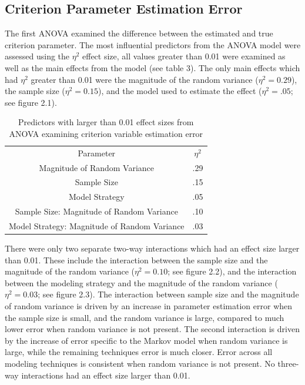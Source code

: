 \documentclass[12pt]{./styles/outhesis}
\begin{document}
\subsection{Criterion Parameter Estimation Error}
The first ANOVA examined the difference between the estimated and true
criterion parameter. The most influential predictors from the ANOVA
model were assessed using the \(\eta^2\) effect size, all values greater
than 0.01 were examined as well as the main effects from the model (see
table 3). The only main effects which had \(\eta^2\) greater than 0.01
were the magnitude of the random variance (\(\eta^2=0.29\)), the sample
size (\(\eta^2=0.15\)), and the model used to estimate the effect
(\(\eta^2=.05\); see figure 2.1).


\begin{table}
    \centering
    \begin{tabular}{cc}
        Parameter & \(\eta^2\) \\
        Magnitude of Random Variance & .29 \\
        Sample Size & .15\\
        Model Strategy & .05 \\
        Sample Size: Magnitude of Random Variance & .10 \\
         Model Strategy: Magnitude of Random Variance & .03 \\
    \end{tabular}
    \caption{Predictors with larger than 0.01 effect sizes from ANOVA
examining criterion variable estimation error}
    \label{tab:my_label}
\end{table}

There were only two separate two-way interactions which had an effect
size larger than 0.01. These include the interaction between the sample
size and the magnitude of the random variance (\(\eta^2 = 0.10\); see
figure 2.2), and the interaction between the modeling strategy and the
magnitude of the random variance (\(\eta^2=0.03\); see figure 2.3). The
interaction between sample size and the magnitude of random variance is
driven by an increase in parameter estimation error when the sample size
is small, and the random variance is large, compared to much lower error
when random variance is not present. The second interaction is driven by
the increase of error specific to the Markov model when random variance
is large, while the remaining techniques error is much closer. Error
across all modeling techniques is consistent when random variance is not
present. No three-way interactions had an effect size larger than 0.01.
\end{document}
